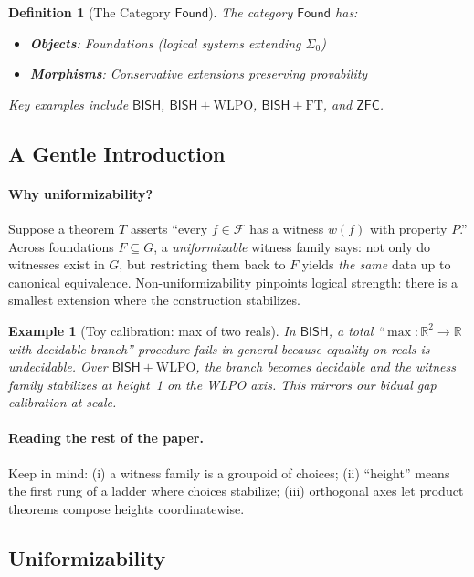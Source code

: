 \documentclass[11pt]{article}
\newtheorem{definition}[theorem]{Definition}
\newtheorem{example}[theorem]{Example}
\newcommand{\R}{\mathbb{R}}
\newcommand{\WLPO}{\mathrm{WLPO}}
\newcommand{\FT}{\mathrm{FT}}
\newcommand{\BISH}{\mathsf{BISH}}
\newcommand{\ZFC}{\mathsf{ZFC}}
\newcommand{\Found}{\mathsf{Found}}
\newcommand{\SigmaZero}{\Sigma_{0}}
\begin{document}
\begin{definition}[The Category $\Found$]
The category $\Found$ has:
\begin{itemize}
\item \textbf{Objects}: Foundations (logical systems extending $\SigmaZero$)
\item \textbf{Morphisms}: Conservative extensions preserving provability
\end{itemize}
Key examples include $\BISH$, $\BISH + \WLPO$, $\BISH + \FT$, and $\ZFC$.
\end{definition}

\subsection{A Gentle Introduction}\label{subsec:gently}

\paragraph{Why uniformizability?}
Suppose a theorem $T$ asserts ``every $f\in\mathcal{F}$ has a witness $w(f)$ with property $P$.''
Across foundations $F\subseteq G$, a \emph{uniformizable} witness family says:
not only do witnesses exist in $G$, but restricting them back to $F$ yields \emph{the same} data up to canonical equivalence. Non-uniformizability pinpoints logical strength: there is a smallest extension where the construction stabilizes.

\begin{example}[Toy calibration: max of two reals]
In $\BISH$, a total ``$\max:\R^2\to\R$ with decidable branch'' procedure fails in general because equality on reals is undecidable. Over $\BISH+\WLPO$, the branch becomes decidable and the witness family stabilizes at height~1 on the WLPO axis. This mirrors our bidual gap calibration at scale.
\end{example}

\paragraph{Reading the rest of the paper.}
Keep in mind: (i) a witness family is a groupoid of choices; (ii) ``height'' means the first rung of a ladder where choices stabilize; (iii) orthogonal axes let product theorems compose heights coordinatewise.

\subsection{Uniformizability}
\end{document}
